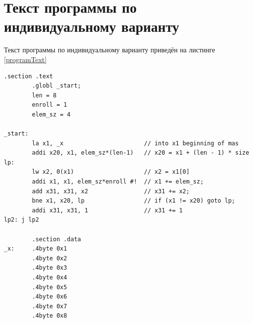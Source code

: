 \documentclass[12pt]{report}
\begin{document}
\section{Текст программы по индивидуальному варианту}
Текст программы по индивидуальному варианту приведён на листинге \ref{programText}
\begin{lstlisting}[label=programText,caption=Текст программы по индивидуальному варианту]
        .section .text
        .globl _start;
        len = 8
        enroll = 1 
        elem_sz = 4 

_start:
        la x1, _x                       // into x1 beginning of mas
        addi x20, x1, elem_sz*(len-1)   // x20 = x1 + (len - 1) * size
lp:
        lw x2, 0(x1)                    // x2 = x1[0]
        addi x1, x1, elem_sz*enroll #!  // x1 += elem_sz;
        add x31, x31, x2                // x31 += x2;
        bne x1, x20, lp                 // if (x1 != x20) goto lp;
        addi x31, x31, 1                // x31 += 1
lp2: j lp2

        .section .data
_x:     .4byte 0x1
        .4byte 0x2
        .4byte 0x3
        .4byte 0x4
        .4byte 0x5
        .4byte 0x6
        .4byte 0x7
        .4byte 0x8
\end{lstlisting}
\end{document}
